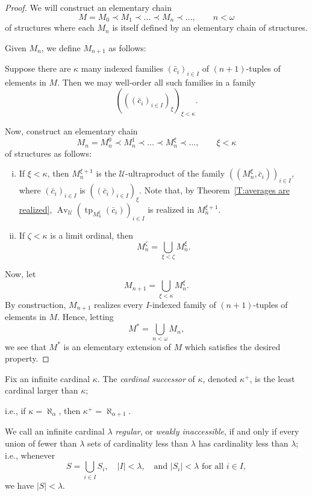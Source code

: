 \documentclass{scrartcl}
\DeclareMathOperator{\Av}{Av }
\DeclareMathOperator{\tp}{tp}
\newcommand{\SU}{\mathscr{U}}
\begin{document}
\begin{proof}
We will construct an elementary chain
\[
M = M_0 \prec M_1 \prec \dots \prec M_n \prec \dots, \qquad n < \omega
\]
of structures where each $M_n$ is itself defined by an elementary chain of structures.

Given $M_n$, we define $M_{n+1}$ as follows:

Suppose there are $\kappa$ many indexed families $(\bar{c}_i)_{i\in I}$ of $(n+1)$-tuples of elements in $M$. Then we may well-order all such families in a family
\[
(((\bar{c}_i)_{i\in I})_\xi)_{\xi < \kappa}.
\]

Now, construct an elementary chain
\[
M_n = M_n^0 \prec M_n^1 \prec \dots \prec M_n^\xi \prec \dots, \qquad \xi < \kappa
\]
of structures as follows:
\begin{enumerate}[i)]
\item If $\xi < \kappa$, then $M_n^{\xi + 1}$ is the $\SU$-ultraproduct of the family $((M_n^\xi, \bar{c}_i))_{i\in I}$, where $(\bar{c}_i)_{i\in I}$ is $((\bar{c}_i)_{i\in I})_\xi$.
Note that, by Theorem~\ref{T:averages are realized}, $\Av_\SU (\tp_{M_n^\xi} (\bar{c}_i))_{i\in I}$ is realized in $M_n^{\xi + 1}$.
\item If $\zeta < \kappa$ is a limit ordinal, then
\[
M_n^\zeta = \bigcup_{\xi < \zeta} M_n^\xi.
\]
\end{enumerate}

Now, let 
\[
M_{n+1} = \bigcup_{\xi < \kappa} M_n^\xi.
\]
By construction, $M_{n+1}$ realizes every $I$-indexed family of $(n+1)$-tuples of elements in $M$. Hence, letting
\[
M^* = \bigcup_{n < \omega} M_n,
\]
we see that $M^*$ is an elementary extension of $M$ which satisfies the desired property.
\end{proof}

\begin{definition}
Fix an infinite cardinal $\kappa$. The \emph{cardinal successor} of $\kappa$, denoted $\kappa^+$, is the least cardinal larger than $\kappa$;

i.e.,
if $\kappa=\aleph_\alpha$, then $\kappa^+=\aleph_{\alpha+1}$.
\end{definition}


\begin{definition}
We call an infinite cardinal $\lambda$ \emph{regular}, or \emph{weakly inaccessible}, if and only if every union of fewer than $\lambda$ sets of cardinality less than $\lambda$ has cardinality less than $\lambda$; i.e.,
whenever
\[
S = \bigcup_{i\in I} S_i, \quad |I|< \lambda, \quad \text{and } |S_i| < \lambda \text{ for all } i\in I,
\]
we have $|S| < \lambda$.
\end{definition}
\end{document}
